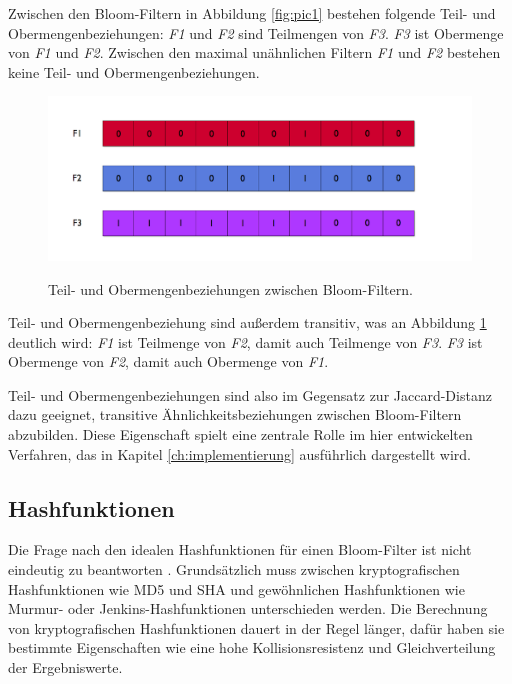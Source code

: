 Zwischen den Bloom-Filtern in Abbildung \ref{fig:pic1} bestehen folgende Teil- und Obermengenbeziehungen: \textit{F1} und \textit{F2} sind Teilmengen von \textit{F3}. \textit{F3} ist Obermenge von \textit{F1} und \textit{F2}. Zwischen den maximal unähnlichen Filtern \textit{F1} und \textit{F2} bestehen keine Teil- und Obermengenbeziehungen. 
\begin{figure}[hpbt]
  \centering
  \includegraphics[width=1.0\textwidth]{pictures/distances.png}\\
  \caption[Teil- und Obermengenbeziehungen zwischen Bloom-Filtern]{Teil- und Obermengenbeziehungen zwischen Bloom-Filtern.}\label{fig:pic2}
\end{figure}

\noindent
Teil- und Obermengenbeziehung sind außerdem transitiv, was an Abbildung \ref{fig:pic2} deutlich wird: \textit{F1} ist Teilmenge von \textit{F2}, damit auch Teilmenge von \textit{F3}. \textit{F3} ist Obermenge von \textit{F2}, damit auch Obermenge von \textit{F1}. 

Teil- und Obermengenbeziehungen sind also im Gegensatz zur Jaccard-Distanz dazu geeignet, transitive Ähnlichkeitsbeziehungen zwischen Bloom-Filtern abzubilden. Diese Eigenschaft spielt eine zentrale Rolle im hier entwickelten Verfahren, das in Kapitel \ref{ch:implementierung} ausführlich dargestellt wird. 
\subsection{Hashfunktionen}\label{sec:hashfunktionen}
Die Frage nach den idealen Hashfunktionen für einen Bloom-Filter ist nicht eindeutig zu beantworten \cite{Broder2004}. Grundsätzlich muss zwischen kryptografischen Hashfunktionen wie MD5 und SHA und gewöhnlichen Hashfunktionen wie Murmur- oder Jenkins-Hashfunktionen unterschieden werden. Die Berechnung von kryptografischen Hashfunktionen dauert in der Regel länger, dafür haben sie bestimmte Eigenschaften wie eine hohe Kollisionsresistenz und Gleichverteilung der Ergebniswerte. 

